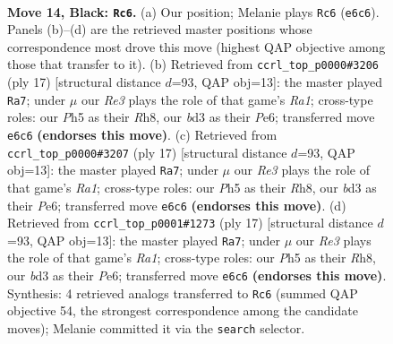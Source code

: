 \documentclass[11pt]{article}
\begin{document}
\clearpage

\begin{figure}[p]\centering
\begin{subfigure}{0.46\textwidth}\centering
\resizebox{\linewidth}{!}{%
\newchessgame
\chessboard[
  setfen={rnbq1k2/p4pp1/1p2rn2/3p2Np/Pb1P3P/1PNB2P1/3K1P2/R1BQ3R b - - 2 14},
  showmover=false,
  pgfstyle=straightmove, color=movearrow, markmove={e6-c6}
]}
\caption{}
\end{subfigure}\hfill
\begin{subfigure}{0.46\textwidth}\centering
\resizebox{\linewidth}{!}{%
\newchessgame
\chessboard[
  setfen={rnbqk2r/2p2ppp/p3pn2/1p2N3/2pP4/P5P1/1P1BPPBP/R2QK2R b KQkq - 1 9},
  showmover=false,
  pgfstyle=straightmove, color=movearrow, markmove={a8-a7}
]}
\caption{}
\end{subfigure}
\\[4pt]
\begin{subfigure}{0.46\textwidth}\centering
\resizebox{\linewidth}{!}{%
\newchessgame
\chessboard[
  setfen={rnbqk2r/2p2ppp/p3pn2/1p2N3/2pP4/P5P1/1P1BPPBP/R2QK2R b KQkq - 1 9},
  showmover=false,
  pgfstyle=straightmove, color=movearrow, markmove={a8-a7}
]}
\caption{}
\end{subfigure}\hfill
\begin{subfigure}{0.46\textwidth}\centering
\resizebox{\linewidth}{!}{%
\newchessgame
\chessboard[
  setfen={rnbqk2r/2p2ppp/p3pn2/1p2N3/2pP4/P5P1/1P1BPPBP/R2QK2R b KQkq - 1 9},
  showmover=false,
  pgfstyle=straightmove, color=movearrow, markmove={a8-a7}
]}
\caption{}
\end{subfigure}
\caption{\textbf{Move 14, Black: \texttt{Rc6}.} (a) Our position; Melanie plays \texttt{Rc6} (\texttt{e6c6}). Panels (b)--(d) are the retrieved master positions whose correspondence most drove this move (highest QAP objective among those that transfer to it). (b) Retrieved from \texttt{ccrl\_top\_p0000\#3206} (ply 17) [structural distance $d$=93, QAP obj=13]: the master played \texttt{Ra7}; under $\mu$ our \emph{Re3} plays the role of that game's \emph{Ra1}; cross-type roles: our \emph{P}h5 as their \emph{R}h8, our \emph{b}d3 as their \emph{P}e6; transferred move \texttt{e6c6} \textbf{(endorses this move)}. (c) Retrieved from \texttt{ccrl\_top\_p0000\#3207} (ply 17) [structural distance $d$=93, QAP obj=13]: the master played \texttt{Ra7}; under $\mu$ our \emph{Re3} plays the role of that game's \emph{Ra1}; cross-type roles: our \emph{P}h5 as their \emph{R}h8, our \emph{b}d3 as their \emph{P}e6; transferred move \texttt{e6c6} \textbf{(endorses this move)}. (d) Retrieved from \texttt{ccrl\_top\_p0001\#1273} (ply 17) [structural distance $d$=93, QAP obj=13]: the master played \texttt{Ra7}; under $\mu$ our \emph{Re3} plays the role of that game's \emph{Ra1}; cross-type roles: our \emph{P}h5 as their \emph{R}h8, our \emph{b}d3 as their \emph{P}e6; transferred move \texttt{e6c6} \textbf{(endorses this move)}. Synthesis: 4 retrieved analogs transferred to \texttt{Rc6} (summed QAP objective 54, the strongest correspondence among the candidate moves); Melanie committed it via the \texttt{search} selector.}
\label{fig:thought-m27}
\end{figure}
\end{document}
